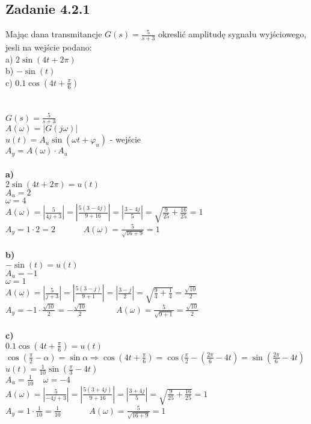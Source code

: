 \subsection*{Zadanie 4.2.1} {\color{darkgray}
	Mając dana transmitancje $G(s)=\frac{5}{s+3}$ okreslić amplitudę sygnału wyjściowego, jesli na wejście podano:\\
	a) $2\sin(4t+2 \pi)$\\
	b) $-\sin(t)$\\
	c) $0.1\cos(4t+\frac\pi 6)$\\
}\lineh
\\\\
$G(s)=\frac{5}{s+3}$\\
$A(\omega)=|G(j\omega)|$\\
$u(t)=A_u\sin(\omega t+\varphi_u )$ - wejście\\
$A_y=A(\omega) \cdot A_u$\\
\\
\textbf{a)}\\
$2\sin(4t+2\pi)=u(t)$\\
$A_u=2$\\
$\omega=4$\\
$A(\omega)=|\frac{5}{4j+3}|=|\frac{5(3-4j)}{9+16}|=|\frac{3-4j}{5}|=\sqrt{\frac{9}{25}+\frac{16}{25}}=1$\\
$A_y=1 \cdot 2 = \boxed{2}$ \ \ \ \ \ \   {\color{lightgray}$A(\omega)=\frac{5}{\sqrt{16+9}}=1$}\\
\\
\textbf{b)}\\
$-\sin(t)=u(t)$\\
$A_u=-1$\\
$\omega=1$\\
$A(\omega)=|\frac{5}{j+3}|=|\frac{5(3-j)}{9+1}|=|\frac{3-j}{2}|=\sqrt{\frac 94+\frac 14}=\frac{\sqrt{10}}{2}$\\
$A_y=-1 \cdot \frac{\sqrt{10}}{2}=\boxed{-\frac{\sqrt{10}}{2}}$\ \ \ \ \ \ \   {\color{lightgray}$A(\omega)=\frac{5}{\sqrt{9+1}}=\frac{\sqrt{10}}{2}$}\\
\\
\textbf{c)}\\
$0.1\cos(4t+\frac\pi 6)=u(t)$\\
$\cos(\frac\pi 2 - \alpha)=\sin \alpha \Rightarrow \cos(4t+\frac \pi 6 ) = \cos (\frac \pi 2 -(\frac{2\pi}{6} - 4t)= \sin(\frac{2\pi}{6}-4t)$\\
$u(t)=\frac{1}{10}\sin(\frac \pi 3 - 4t)$\\
$A_u = \frac{1}{10} \ \ \ \ \ \omega=-4$\\
$A(\omega)=|\frac{5}{-4j+3}|=|\frac{5(3+4j)}{9+16}|=|\frac{3+4j}{5}|=\sqrt{\frac{9}{25}+\frac{16}{25}}=1$\\
$A_y=1 \cdot \frac{1}{10} = \boxed{\frac{1}{10}}$ \ \ \ \ \ \   {\color{lightgray}$A(\omega)=\frac{5}{\sqrt{16+9}}=1$}\\

